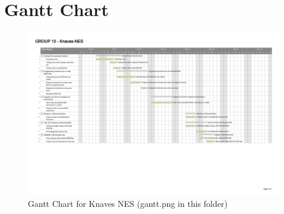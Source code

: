 \documentclass[12pt]{article}
\begin{document}
\section{Gantt Chart}
	\begin{figure}[H]
		\includegraphics[width=180mm]{gantt.png}
		\caption{Gantt Chart for Knaves NES (gantt.png in this folder)}
	\end{figure}

\begin{versionhistory}

\end{versionhistory}
\end{document}
